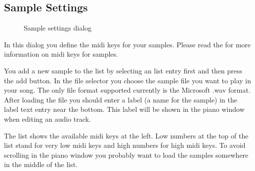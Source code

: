 \documentclass[letterpaper]{report}
\begin{document}
\subsection{Sample Settings}\label{samplesettings}

\begin{figure}
\caption{Sample settings dialog}
\end{figure}

In this dialog you define the midi keys for your samples. Please read
the  for more information on midi
keys for samples.

You add a new sample to the list by selecting an list entry first
and then press the add button. In the file selector you choose the
sample file you want to play in your song. The only file format supported
currently is the Microsoft .wav format. After loading the file you should
enter a label (a name for the sample) in the label text entry near the
bottom. This label will be shown in the piano window when editing an
audio track.

The list shows the available midi keys at the left. Low numbers at the
top of the list stand for very low midi keys and high numbers for high
midi keys. To avoid scrolling in the piano window you probably want to
load the samples somewhere in the middle of the list.
\end{document}
